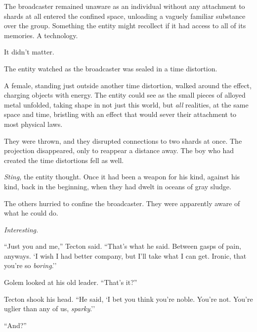 The broadcaster remained unaware as an individual without any attachment to shards at all entered the confined space, unloading a vaguely familiar substance over the group.  Something the entity might recollect if it had access to all of its memories.  A technology.



It didn't matter.



The entity watched as the broadcaster was sealed in a time distortion.



A female, standing just outside another time distortion, walked around the effect, charging objects with energy.  The entity could see as the small pieces of alloyed metal unfolded, taking shape in not just this world, but \emph{all} realities, at the same space and time, bristling with an effect that would sever their attachment to most physical laws.



They were thrown, and they disrupted connections to two shards at once.  The projection disappeared, only to reappear a distance away.  The boy who had created the time distortions fell as well.



\emph{Sting, }the entity thought.  Once it had been a weapon for his kind, against his kind, back in the beginning, when they had dwelt in oceans of gray sludge.



The others hurried to confine the broadcaster.  They were apparently aware of what he could do.



\emph{Interesting.}



\sectionbreak



``Just you and me,'' Tecton said.  ``That's what he said.  Between gasps of pain, anyways.  `I wish I had better company, but I'll take what I can get.  Ironic, that you're so \emph{boring}.''



Golem looked at his old leader.  ``That's it?''



Tecton shook his head.  ``He said, `I bet you think you're noble.  You're not.  You're uglier than any of us, \emph{sparky}.''



``And?''




